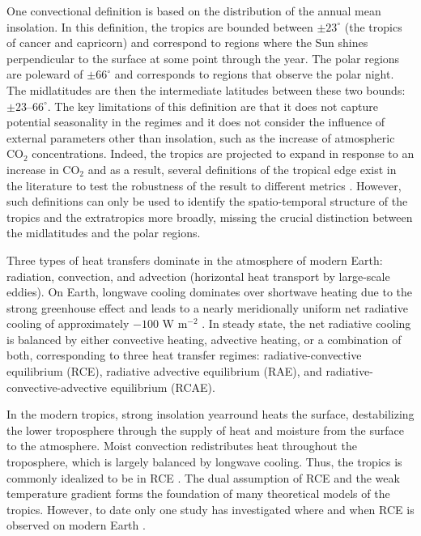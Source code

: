 \documentclass{ametsocV5}
\begin{document}
    One convectional definition is based on the distribution of the annual mean insolation. In this definition, the tropics are bounded between $\pm 23^\circ$ (the tropics of cancer and capricorn) and correspond to regions where the Sun shines perpendicular to the surface at some point through the year. The polar regions are poleward of $\pm66^\circ$ and corresponds to regions that observe the polar night. The midlatitudes are then the intermediate latitudes between these two bounds: $\pm23$--$66^\circ$. The key limitations of this definition are that it does not capture potential seasonality in the regimes and it does not consider the influence of external parameters other than insolation, such as the increase of atmospheric CO$_2$ concentrations. Indeed, the tropics are projected to expand in response to an increase in CO$_2$ and as a result, several definitions of the tropical edge exist in the literature to test the robustness of the result to different metrics \citep{staten2018,waugh2018}. However, such definitions can only be used to identify the spatio-temporal structure of the tropics and the extratropics more broadly, missing the crucial distinction between the midlatitudes and the polar regions.









    Three types of heat transfers dominate in the atmosphere of modern Earth: radiation, convection, and advection (horizontal heat transport by large-scale eddies). On Earth, longwave cooling dominates over shortwave heating due to the strong greenhouse effect and leads to a nearly meridionally uniform net radiative cooling of approximately $-100$ W m$^{-2}$ \citep{lin2008}. In steady state, the net radiative cooling is balanced by either convective heating, advective heating, or a combination of both, corresponding to three heat transfer regimes: radiative-convective equilibrium (RCE), radiative advective equilibrium (RAE), and radiative-convective-advective equilibrium (RCAE).
    
    In the modern tropics, strong insolation yearround heats the surface, destabilizing the lower troposphere through the supply of heat and moisture from the surface to the atmosphere. Moist convection redistributes heat throughout the troposphere, which is largely balanced by longwave cooling. Thus, the tropics is commonly idealized to be in RCE \citep{wing2018}. The dual assumption of RCE and the weak temperature gradient \citep{bretherton2002} forms the foundation of many theoretical models of the tropics. However, to date only one study has investigated where and when RCE is observed on modern Earth \citep{jakob2019}.
    
\end{document}
